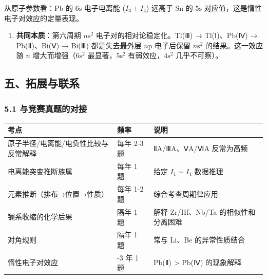 \documentclass[a4paper,11pt]{ctexart}
\providecommand{\tightlist}{\setlength{\itemsep}{0pt}\setlength{\parskip}{0pt}}
\newcounter{none}
\begin{document}
从原子参数看：Pb 的 \(6\mathrm{s}\) 电子电离能 (\(I_3 + I_4\)) 远高于 Sn 的 \(5\mathrm{s}\) 对应值，这是惰性电子对效应的定量表现。

\begin{enumerate}
\def\labelenumi{(\arabic{enumi})}
\setcounter{enumi}{2}
\tightlist
\item
  \textbf{共同本质}：第六周期 \(n\mathrm{s}^2\) 电子对的相对论稳定化。Tl(Ⅲ) → Tl(Ⅰ)、Pb(Ⅳ) → Pb(Ⅱ)、Bi(Ⅴ) → Bi(Ⅲ) 都是失去最外层 \(n\mathrm{p}\) 电子后保留 \(n\mathrm{s}^2\) 的结果。这一效应随 \(n\) 增大而增强（\(6\mathrm{s}^2\) 最显著，\(5\mathrm{s}^2\) 有弱效应，\(4\mathrm{s}^2\) 几乎不可察）。
\end{enumerate}

\subsection{五、拓展与联系}\label{ux4e94ux62d3ux5c55ux4e0eux8054ux7cfb}

\subsubsection{5.1 与竞赛真题的对接}\label{ux4e0eux7adeux8d5bux771fux9898ux7684ux5bf9ux63a5}

{\def\LTcaptype{none} %
\begin{longtable}[]{@{}
  >{\raggedright\arraybackslash}p{}
  >{\centering\arraybackslash}p{}
  >{\raggedright\arraybackslash}p{}@{}}
\toprule\noalign{}
\begin{minipage}[b]{\linewidth}\raggedright
考点
\end{minipage} & \begin{minipage}[b]{\linewidth}\centering
频率
\end{minipage} & \begin{minipage}[b]{\linewidth}\raggedright
说明
\end{minipage} \\
\midrule\noalign{}
\endhead
\bottomrule\noalign{}
\endlastfoot
原子半径/电离能/电负性比较与反常解释 & 每年 2-3 题 & ⅡA/ⅢA、ⅤA/ⅥA 反常为高频 \\
电离能突变推断族属 & 每年 1 题 & 给定 \(I_1\sim I_4\) 数据推理 \\
元素推断（排布→位置→性质） & 每年 1-2 题 & 综合考查周期律应用 \\
镧系收缩的化学后果 & 隔年 1 题 & 解释 Zr/Hf、Nb/Ta 的相似性和分离困难 \\
对角规则 & 隔年 1 题 & 常与 Li、Be 的异常性质结合 \\
惰性电子对效应 & 2-3 年 1 题 & Pb(Ⅱ) \textgreater{} Pb(Ⅳ) 的现象解释 \\
\end{longtable}
}
\end{document}
